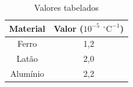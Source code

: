 \begin{table}[H]
\centering
\caption{Valores tabelados}
\begin{tabular}{cc}
\toprule
\textbf{Material} & \textbf{Valor ($10^{-5}$ $^{\circ}\text{C}^{-1} $)} \\
\midrule
Ferro & 1,2 \\
Latão & 2,0 \\
Alumínio & 2,2 \\
\bottomrule
\end{tabular}
\label{tab:t2}
\end{table}